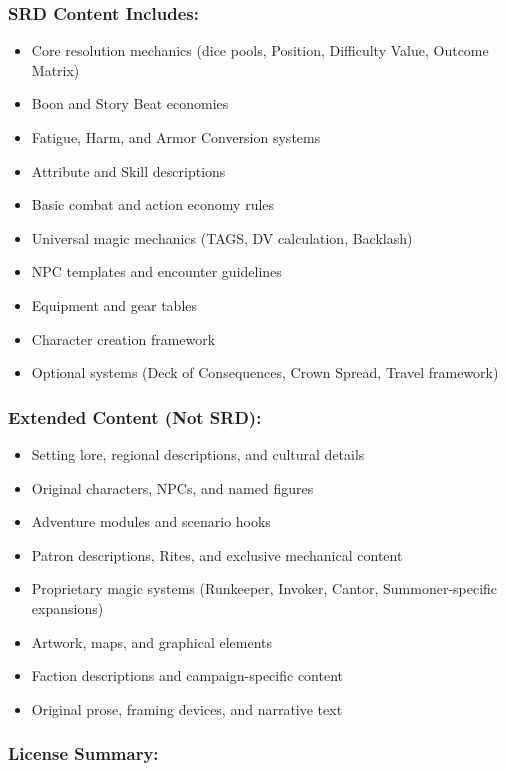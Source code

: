 \documentclass[10pt]{article}
\begin{document}
\subsubsection*{SRD Content Includes:}
\begin{itemize}
\item Core resolution mechanics (dice pools, Position, Difficulty Value, Outcome Matrix)
\item Boon and Story Beat economies
\item Fatigue, Harm, and Armor Conversion systems
\item Attribute and Skill descriptions
\item Basic combat and action economy rules
\item Universal magic mechanics (TAGS, DV calculation, Backlash)
\item NPC templates and encounter guidelines
\item Equipment and gear tables
\item Character creation framework
\item Optional systems (Deck of Consequences, Crown Spread, Travel framework)
\end{itemize}

\subsubsection*{Extended Content (Not SRD):}
\begin{itemize}
\item Setting lore, regional descriptions, and cultural details
\item Original characters, NPCs, and named figures
\item Adventure modules and scenario hooks
\item Patron descriptions, Rites, and exclusive mechanical content
\item Proprietary magic systems (Runkeeper, Invoker, Cantor, Summoner-specific expansions)
\item Artwork, maps, and graphical elements
\item Faction descriptions and campaign-specific content
\item Original prose, framing devices, and narrative text
\end{itemize}

\subsubsection*{License Summary:}
\end{document}
